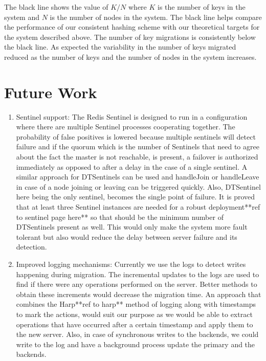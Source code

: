 \documentclass[10pt,twocolumn,letterpaper]{article}
\begin{document}
The black line shows the value of \(K/N\) where \(K\) is the number of keys in the system and \(N\) is the number of nodes in the system. The black line helps compare the performance of our consistent hashing scheme with our theoretical targets for the system described above. The number of key migrations is consistently below the black line. As expected the variability in the number of keys migrated reduced as the number of keys and the number of nodes in the system increases.

\section{Future Work} \label{futurework}
\begin{enumerate}
\item Sentinel support: The Redis Sentinel is designed to run in a configuration where there are multiple Sentinel processes cooperating together. The probability of false positives is lowered because multiple sentinels will detect failure and if the quorum which is the number of Sentinels that need to agree about the fact the master is not reachable, is present, a failover is authorized immediately as opposed to after a delay in the case of a single sentinel. A similar approach for DTSentinels can be used and handleJoin or handleLeave in case of a node joining or leaving can be triggered quickly. Also, DTSentinel here being the only sentinel, becomes the single point of failure. It is proved that at least three Sentinel instances are needed for a robust deployment**ref to sentinel page here** so that should be the minimum number of DTSentinels present as well. This would only make the system more fault tolerant but also would reduce the delay between server failure and its detection.

\item Improved logging mechanisms: Currently we use the logs to detect writes happening during migration. The incremental updates to the logs are used to find if there were any operations performed on the server. Better methods to obtain these increments would decrease the migration time. An approach that combines the Harp**ref to harp** method of logging along with timestamps to mark the actions, would suit our purpose as we would be able to extract operations that have occurred after a certain timestamp and apply them to the new server. Also, in case of synchronous writes to the backends, we could write to the log and have a background process update the primary and the backends.


\end{enumerate}
\end{document}
